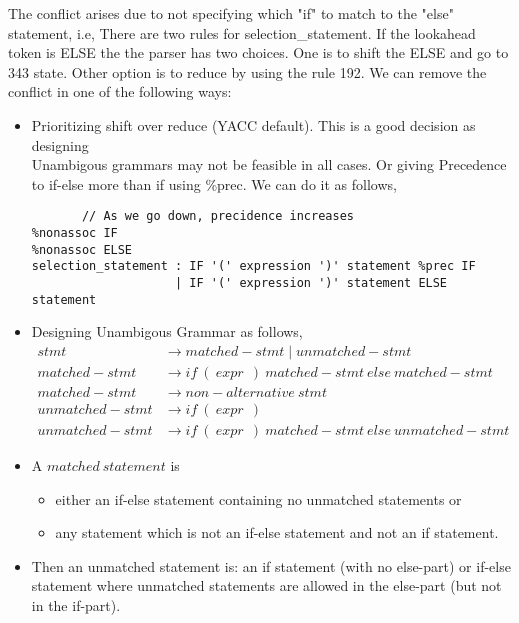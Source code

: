 \documentclass[english,a4paper,12pt]{article}
\begin{document}
The conflict arises due to not specifying which "if" to match to the "else" statement, i.e, There are two rules for selection\_statement. If the lookahead token is ELSE the the parser
has two choices. One is to shift the ELSE and go to 343 state. Other option is to reduce by
using the rule 192.
We can remove the conflict in one of the following ways:
   \begin{itemize}
       \item Prioritizing shift over reduce (YACC default). This is a good decision as designing \\ Unambigous grammars may not be feasible in all cases. Or giving Precedence to if-else more than if using \%prec. We can do it as follows,
       \begin{verbatim}
       // As we go down, precidence increases
%nonassoc IF
%nonassoc ELSE
selection_statement : IF '(' expression ')' statement %prec IF
                    | IF '(' expression ')' statement ELSE statement
       \end{verbatim}
       \item Designing Unambigous Grammar as follows,
       $$
       \begin{aligned}
       stmt &\rightarrow matched-stmt \mid unmatched-stmt \\ 
       matched-stmt &\rightarrow if\ (\ expr\ \ )\ matched-stmt\ else \ matched-stmt \\ 
       matched-stmt &\rightarrow non-alternative\ stmt \\ 
       unmatched-stmt &\rightarrow if\ (\ expr\ \ )\ \\ 
       unmatched-stmt &\rightarrow if\ (\ expr\ \ )\ 
       matched-stmt\ else\ unmatched-stmt
       \end{aligned}
       $$
   \end{itemize}
   \begin{itemize}
       \item A $matched\ statement$ is
   \begin{itemize}
       \item  either an if-else statement containing no unmatched statements or 
       \item any statement which is not an if-else statement and not an if statement.
   \end{itemize}
   \item Then an unmatched statement is:
        an if statement (with no else-part) 
        or if-else statement where unmatched statements are allowed in the else-part (but not in the if-part).
   \end{itemize}
\end{document}
